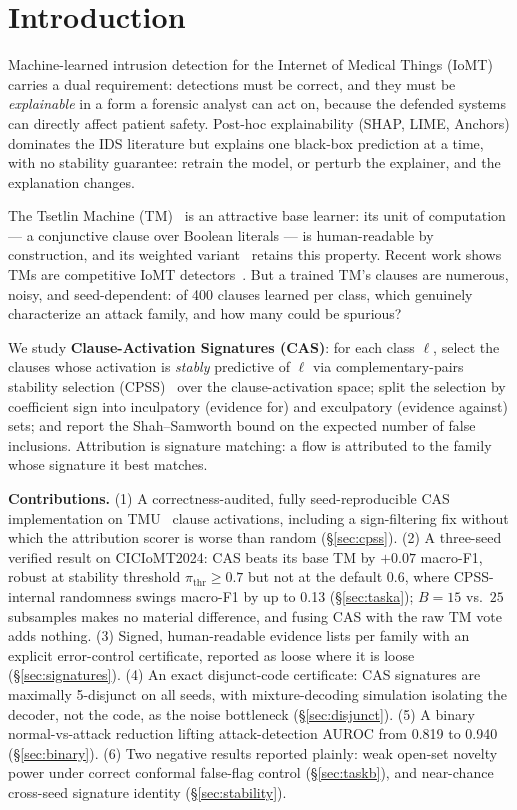 \documentclass[conference]{IEEEtran}
\begin{document}
\section{Introduction}
Machine-learned intrusion detection for the Internet of Medical Things
(IoMT) carries a dual requirement: detections must be correct, and they must
be \emph{explainable} in a form a forensic analyst can act on, because the
defended systems can directly affect patient safety. Post-hoc explainability
(SHAP, LIME, Anchors) dominates the IDS literature but explains one
black-box prediction at a time, with no stability guarantee: retrain the
model, or perturb the explainer, and the explanation changes.

The Tsetlin Machine (TM)~\cite{granmo2018} is an attractive base learner:
its unit of computation --- a conjunctive clause over Boolean literals ---
is human-readable by construction, and its weighted variant~\cite{phoulady2020}
retains this property. Recent work shows TMs are competitive IoMT
detectors~\cite{jaiswal2026iomt}. But a trained TM's clauses are numerous,
noisy, and seed-dependent: of 400 clauses learned per class, which genuinely
characterize an attack family, and how many could be spurious?

We study \textbf{Clause-Activation Signatures (CAS)}: for each class $\ell$,
select the clauses whose activation is \emph{stably} predictive of $\ell$
via complementary-pairs stability selection (CPSS)~\cite{shah2013} over the
clause-activation space; split the selection by coefficient sign into
inculpatory (evidence for) and exculpatory (evidence against) sets; and
report the Shah--Samworth bound on the expected number of false inclusions.
Attribution is signature matching: a flow is attributed to the family whose
signature it best matches.

\textbf{Contributions.}
(1) A correctness-audited, fully seed-reproducible CAS implementation on
TMU~\cite{tmu} clause activations, including a sign-filtering fix without
which the attribution scorer is worse than random (\S\ref{sec:cpss}).
(2) A three-seed verified result on CICIoMT2024: CAS beats its base TM by
$+0.07$ macro-F1, robust at stability threshold $\pi_{\mathrm{thr}} \ge 0.7$
but not at the default 0.6, where CPSS-internal randomness swings macro-F1
by up to 0.13 (\S\ref{sec:taska}); $B{=}15$ vs.\ $25$ subsamples makes no
material difference, and fusing CAS with the raw TM vote adds nothing.
(3) Signed, human-readable evidence lists per family with an explicit
error-control certificate, reported as loose where it is loose
(\S\ref{sec:signatures}).
(4) An exact disjunct-code certificate: CAS signatures are maximally
5-disjunct on all seeds, with mixture-decoding simulation isolating the
decoder, not the code, as the noise bottleneck (\S\ref{sec:disjunct}).
(5) A binary normal-vs-attack reduction lifting attack-detection AUROC from
0.819 to 0.940 (\S\ref{sec:binary}).
(6) Two negative results reported plainly: weak open-set novelty power under
correct conformal false-flag control (\S\ref{sec:taskb}), and near-chance
cross-seed signature identity (\S\ref{sec:stability}).
\end{document}
